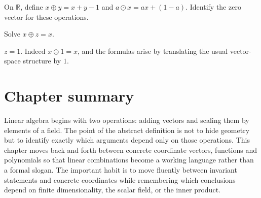 \begin{exercise}\label{exr:i01-expand-16}
On \(\mathbb R\), define \(x\oplus y=x+y-1\) and \(a\odot x=ax+(1-a)\). Identify the zero vector for these operations.
\end{exercise}
\begin{hint}
Solve \(x\oplus z=x\).
\end{hint}
\begin{solution}
\(z=1\). Indeed \(x\oplus1=x\), and the formulas arise by translating the usual vector-space structure by \(1\).
\end{solution}
\section*{Chapter summary}
Linear algebra begins with two operations: adding vectors and scaling them by elements of a field. The point of the abstract definition is not to hide geometry but to identify exactly which arguments depend only on those operations. This chapter moves back and forth between concrete coordinate vectors, functions and polynomials so that linear combinations become a working language rather than a formal slogan.
The important habit is to move fluently between invariant statements and concrete coordinates while remembering which conclusions depend on finite dimensionality, the scalar field, or the inner product.
